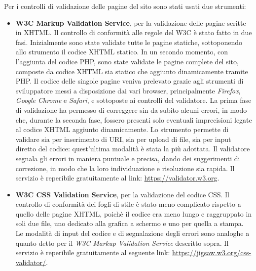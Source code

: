 Per i controlli di validazione delle pagine del sito sono stati usati due strumenti:
\begin{itemize}
	\item \textbf{W3C Markup Validation Service}, per la validazione delle pagine scritte in XHTML. Il controllo di conformità alle regole del W3C è stato fatto in due fasi. Inizialmente sono state validate tutte le pagine statiche, sottoponendo allo strumento il codice XHTML statico. In un secondo momento, con l'aggiunta del codice PHP, sono state validate le pagine complete del sito, composte da codice XHTML sia statico che aggiunto dinamicamente tramite PHP. Il codice delle singole pagine veniva prelevato grazie agli strumenti di sviluppatore messi a disposizione dai vari browser, principalmente \textit{Firefox}, \textit{Google Chrome} e \textit{Safari}, e sottoposte ai controlli del validatore. La prima fase di validazione ha permesso di correggere sin da subito alcuni errori, in modo che, durante la seconda fase, fossero presenti solo eventuali imprecisioni legate al codice XHTML aggiunto dinamicamente. Lo strumento permette di validare sia per inserimento di URI, sia per upload di file, sia per input diretto del codice: quest'ultima modalità è stata la più adottata. Il validatore segnala gli errori in maniera puntuale e precisa, dando dei suggerimenti di correzione, in modo che la loro individuazione e risoluzione sia rapida. Il servizio è reperibile gratuitamente al link: \url{https://validator.w3.org}.
	
	\item \textbf{W3C CSS Validation Service}, per la validazione del codice CSS. Il controllo di conformità dei fogli di stile è stato meno complicato rispetto a quello delle pagine XHTML, poichè il codice era meno lungo e raggruppato in soli due file, uno dedicato alla grafica a schermo e uno per quella a stampa. Le modalità di input del codice e di segnalazione degli errori sono analoghe a quanto detto per il \textit{W3C Markup Validation Service} descritto sopra. Il servizio è reperibile gratuitamente al seguente link: \url{https://jigsaw.w3.org/css-validator/}.
\end{itemize}